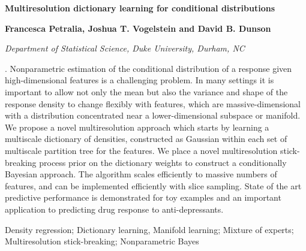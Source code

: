 \documentclass[11pt]{article}
\newif\ifpdf
\begin{document}
\ifpdf
	\DeclareGraphicsExtensions{.pdf, .jpg, .tif}
	\else
	\fi




\begin{center}
{\Large {\bf Multiresolution dictionary learning for conditional distributions}}
\vskip 12pt 

{\large {\bf Francesca Petralia, Joshua T. Vogelstein and David B. Dunson}}
\vskip 12pt 
 
{\em Department of Statistical Science, Duke University, Durham, NC}
\end{center}
\vskip 18pt

{.\quad 
Nonparametric estimation of the conditional distribution of a response given high-dimensional features is a challenging problem.  In many settings it is important to allow not only the mean but also the variance and shape of the response density to change flexibly with features, which are massive-dimensional with a distribution concentrated near a lower-dimensional subspace or manifold.  We propose a novel multiresolution approach which starts by learning a multiscale dictionary of densities, constructed as Gaussian within each set of multiscale partition tree for the features.  We place a novel multiresolution stick-breaking process prior on the dictionary weights to construct a conditionally Bayesian approach.  The algorithm scales efficiently to massive numbers of features, and can be implemented efficiently with slice sampling.  State of the art predictive performance is demonstrated for toy examples and an important application to predicting drug response to anti-depressants.

}
\vskip 12pt

{ 
Density regression; Dictionary learning, Manifold learning; Mixture of experts; Multiresolution stick-breaking; Nonparametric Bayes
}
\end{document}
